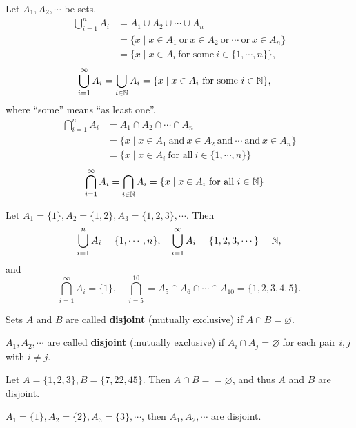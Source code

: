   \begin{definition}
    Let $A_1, A_2, \cdots$ be sets.
    \begin{align*}
      \bigcup_{i=1}^n A_i & = A_1\cup A_2\cup\cdots\cup A_n\\
      & = \{x\mid x\in
        A_1~\text{or}~x\in A_2~\text{or}~\cdots~\text{or}~x\in A_n\}\\
                          & = \{x\mid x\in A_i~\text{for some}~i\in \{1, \cdots,n\}\},
    \end{align*}
    \begin{align*}
      \bigcup_{i=1}^\infty A_i & = \bigcup_{i\in \mathbb{N}} A_i = \{x\mid x\in A_i~\text{for some}~i \in \mathbb{N}\},
    \end{align*}
    where ``some'' means ``as least one''.
    \begin{align*}
          \bigcap_{i=1}^n A_i & =A_1\cap A_2\cap\cdots\cap A_n\\
      & = \{x\mid x\in
        A_1~\text{and}~x\in A_2~\text{and}~\cdots~\text{and}~x\in A_n\}\\
                          & = \{x\mid x\in A_i~\text{for all}~i\in \{1, \cdots,n\}\}
    \end{align*}
    \begin{align*}
      \bigcap_{i=1}^\infty A_i & = \bigcap_{i\in \mathbb{N}} A_i = \{x\mid x\in A_i~\text{for all}~i \in \mathbb{N}\}
    \end{align*}
  \end{definition}

  \begin{example}
    Let $A_1 = \{1\}, A_2 = \{1,2\}, A_3 = \{1,2,3\},\cdots$. Then
    \[
      \bigcup_{i=1}^n A_i = \{1,\cdots, n\}, \quad \bigcup_{i=1}^\infty A_i =
      \{1, 2, 3,\cdots\} = \mathbb{N},
    \]
    and
    \[
      \bigcap_{i=1}^\infty A_i = \{1\},\quad \bigcap_{i=5}^{10} = A_5\cap A_6
      \cap\cdots\cap A_{10} = \{1, 2, 3, 4,5\}.
    \]
  \end{example}

  \begin{definition}
    Sets $A$ and $B$ are called \textbf{disjoint} (mutually exclusive) if $A\cap
    B = \varnothing$.

    $A_1, A_2,\cdots$ are called \textbf{disjoint} (mutually exclusive) if
    $A_i\cap A_j = \varnothing$ for each pair $i, j$ with $i\neq j$.
  \end{definition}

  \begin{example}
    Let $A=\{1,2,3\}, B=\{7, 22,45\}$. Then $A\cap B = =\varnothing$, and thus $A$
    and $B$ are disjoint.

    $A_1 =\{1\}, A_2=\{2\}, A_3 = \{3\},\cdots$, then $A_1, A_2,\cdots$ are disjoint.
  \end{example}


